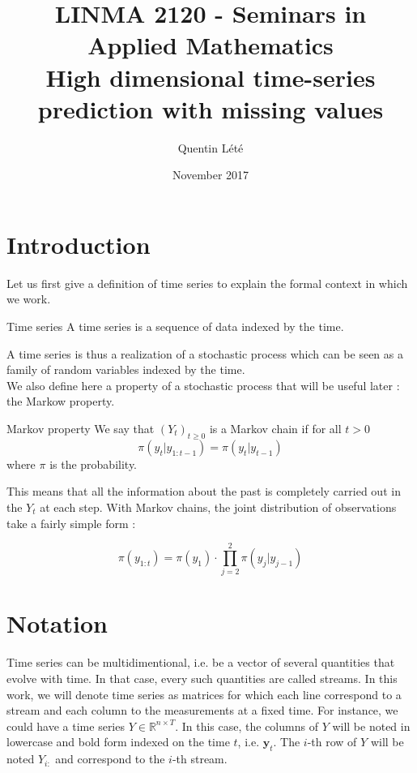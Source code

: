 \documentclass{article}
\title{LINMA 2120 - Seminars in Applied Mathematics \\
        High dimensional time-series prediction with missing values}
\author{Quentin Lété}
\date{November 2017}
\begin{document}
\maketitle

\section{Introduction}

Let us first give a definition of time series to explain the formal context in which we work. \\

\theoremstyle{definition}
\begin{definition}{Time series}
A time series is a sequence of data indexed by the time.
\end{definition}

A time series is thus a realization of a stochastic process which can be seen as a family of random variables indexed by the time. \\

We also define here a property of a stochastic process that will be useful later : the Markow property. \\

\theoremstyle{definition}
\begin{definition}{Markov property}
We say that $(Y_t)_{t \ge 0}$ is a Markov chain if for all $t > 0$
$$\pi(y_t|y_{1:t-1}) = \pi(y_t|y_{t-1})$$
where $\pi$ is the probability.
\end{definition}

This means that all the information about the past is completely carried out in the $Y_t$ at each step. With Markov chains, the joint distribution of observations take a fairly simple form :

$$\pi(y_{1:t}) = \pi(y_1) \cdot \prod_{j=2}^2 \pi(y_j|y_{j-1})$$

\section*{Notation}

Time series can be multidimentional, i.e. be a vector of several quantities that evolve with time. In that case, every such quantities are called streams. In this work, we will denote time series as matrices for which each line correspond to a stream and each column to the measurements at a fixed time. For instance, we could have a time series $Y \in \mathbb{R}^{n \times T}$. In this case, the columns of $Y$ will be noted in lowercase and bold form indexed on the time $t$, i.e. $\mathbf{y}_t$. The $i$-th row of $Y$ will be noted $Y_{i:}$ and correspond to the $i$-th stream.
\end{document}
